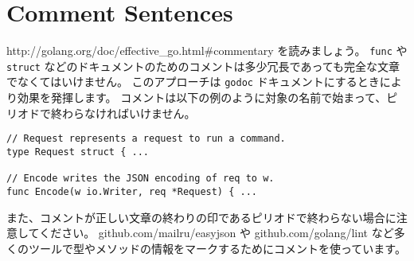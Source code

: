 \section{Comment Sentences}

\texttt{}


http:\//\//golang.org\//doc\//effective\_go.html\#commentary を読みましょう。 \texttt{func} や \texttt{struct} などのドキュメントのためのコメントは多少冗長であっても完全な文章でなくてはいけません。 このアプローチは \texttt{godoc} ドキュメントにするときにより効果を発揮します。 コメントは以下の例のように対象の名前で始まって、ピリオドで終わらなければいけません。


\begin{lstlisting}[]
// Request represents a request to run a command.
type Request struct { ...

// Encode writes the JSON encoding of req to w.
func Encode(w io.Writer, req *Request) { ...
\end{lstlisting}


また、コメントが正しい文章の終わりの印であるピリオドで終わらない場合に注意してください。 github.com\//mailru\//easyjson や github.com\//golang\//lint など多くのツールで型やメソッドの情報をマークするためにコメントを使っています。

